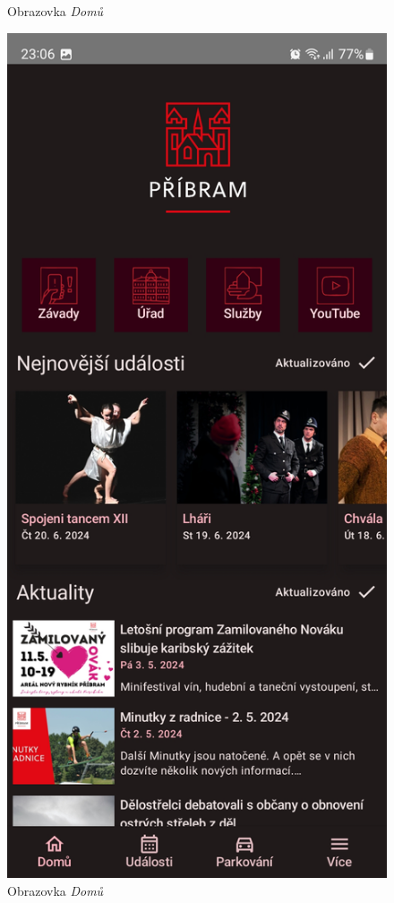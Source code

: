 \begin{figure}[H]
    \caption{Obrazovka \textit{Domů}}
  \endminipage\hfill
    \includegraphics[width=\linewidth]{screens/1a_B.jpg}
    \caption{Obrazovka \textit{Domů}}
  \endminipage\hfill
\end{figure}

